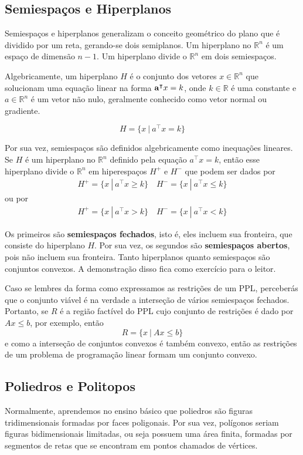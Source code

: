 \subsection{Semiespaços e Hiperplanos}
Semiespaços e hiperplanos generalizam o conceito geométrico do plano que é dividido por um reta, gerando-se dois semiplanos. Um hiperplano no $\mathbb{R}^n$ é um espaço de dimensão $n-1$. Um hiperplano divide o $\mathbb{R}^n$ em dois semiespaços.

Algebricamente, um hiperplano $H$ é o conjunto dos vetores $x \in \mathbb{R}^n$ que solucionam uma equação linear na forma $\mathbf{a}^\intercal x = k$, onde $k \in \mathbb{R}$ é uma constante e $a \in \mathbb{R}^n$ é um vetor não nulo, geralmente conhecido como vetor normal ou gradiente.

\begin{equation*}
	H = \{x\ |\ a^\intercal x = k\}
\end{equation*}

Por sua vez, semiespaços são definidos algebricamente como inequações lineares. Se $H$ é um hiperplano no $\mathbb{R}^n$ definido pela equação $a^\intercal x = k$, então esse hiperplano divide o $\mathbb{R}^n$ em hiperespaços $H^+$ e $H^-$ que podem ser dados por
\begin{align*}
	H^+ = \{x \ |\ a^\intercal x  \geq k\} \quad
	H^- = \{x \ |\ a^\intercal x  \leq k\}
\end{align*}
ou por
\begin{align*}
	H^+ = \{x \ |\ a^\intercal x  > k\} \quad
	H^- = \{x \ |\ a^\intercal x  < k\}
\end{align*}

Os primeiros são \textbf{semiespaços fechados}, isto é, eles incluem sua fronteira, que consiste do hiperplano $H$. Por sua vez, os segundos são \textbf{semiespaços abertos}, pois não incluem sua fronteira. Tanto hiperplanos quanto semiespaços são conjuntos convexos. A demonstração disso fica como exercício para o leitor.

Caso se lembres da forma como expressamos as restrições de um PPL, perceberás que o conjunto viável é na verdade a interseção de vários semiespaços fechados. Portanto, se $R$ é a região factível do PPL cujo conjunto de restrições é dado por $Ax \leq b$, por exemplo, então
\[R = \{x \ | \ Ax \leq b\}\]
e como a interseção de conjuntos convexos é também convexo, então as restrições de um problema de programação linear formam um conjunto convexo.

\subsection{Poliedros e Politopos}
Normalmente, aprendemos no ensino básico que poliedros são figuras tridimensionais formadas por faces poligonais. Por sua vez, polígonos seriam figuras bidimensionais limitadas, ou seja possuem uma área finita, formadas por segmentos de retas que se encontram em pontos chamados de vértices.

